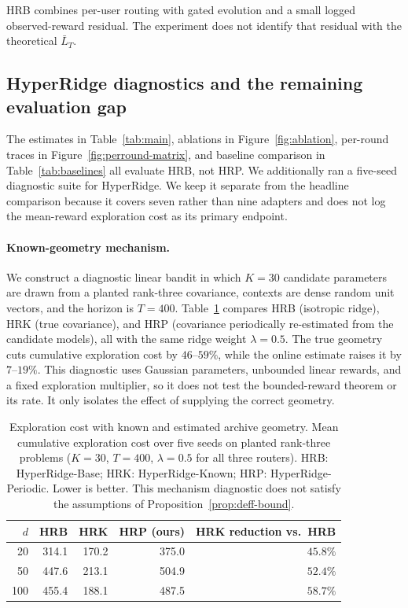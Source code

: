 \documentclass{article} %
\begin{document}
HRB combines per-user routing with gated evolution and a small logged observed-reward residual. The experiment does not identify that residual with the theoretical \(\bar L_T\).

\subsection{HyperRidge diagnostics and the remaining evaluation gap}
\label{sec:exp-hyper-ridge-plan}

The estimates in Table~\ref{tab:main}, ablations in
Figure~\ref{fig:ablation}, per-round traces in
Figure~\ref{fig:perround-matrix}, and baseline comparison in
Table~\ref{tab:baselines} all evaluate HRB, not HRP. We
additionally ran a five-seed diagnostic suite for HyperRidge. We
keep it separate from the headline comparison because it covers seven rather
than nine adapters and does not log the mean-reward exploration cost as its
primary endpoint.

\paragraph{Known-geometry mechanism.}
We construct a diagnostic linear bandit in which $K=30$ candidate parameters are drawn from a planted rank-three covariance, contexts are dense random unit vectors, and the horizon is $T=400$. Table~\ref{tab:hyper-diagnostic} compares HRB (isotropic ridge), HRK (true covariance), and HRP (covariance periodically re-estimated from the candidate models), all with the same ridge weight $\lambda=0.5$. The true geometry cuts cumulative exploration cost by $46$--$59\%$, while the online estimate raises it by $7$--$19\%$. This diagnostic uses Gaussian parameters, unbounded linear rewards, and a fixed exploration multiplier, so it does not test the bounded-reward theorem or its rate. It only isolates the effect of supplying the correct geometry.

\begin{table}[H]
\centering
\small
\begin{tabular}{rrrrr}
\toprule
$d$ & HRB & HRK & HRP (ours) & HRK reduction vs.\ HRB \\
\midrule
20  & 314.1 & 170.2 & 375.0 & $45.8\%$ \\
50  & 447.6 & 213.1 & 504.9 & $52.4\%$ \\
100 & 455.4 & 188.1 & 487.5 & $58.7\%$ \\
\bottomrule
\end{tabular}
\caption{Exploration cost with known and estimated archive geometry.
Mean cumulative exploration cost over five seeds on planted rank-three
problems ($K=30$, $T=400$, $\lambda=0.5$ for all three routers).
HRB: HyperRidge-Base; HRK: HyperRidge-Known; HRP: HyperRidge-Periodic.
Lower is better. This mechanism diagnostic does not satisfy the assumptions
of Proposition~\ref{prop:deff-bound}.}
\label{tab:hyper-diagnostic}
\end{table}
\end{document}
